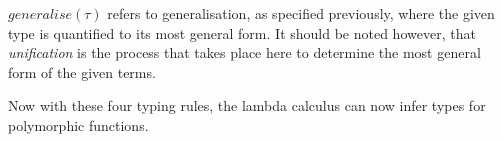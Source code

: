 \documentclass{l4proj}
\begin{document}
$generalise(\tau)$ refers to generalisation, as specified previously, where the given type is quantified to its most general form.
It should be noted however, that \emph{unification} is the process that takes place here to determine the most general form of the given terms.

Now with these four typing rules, the lambda calculus can now infer types for polymorphic functions.

    

    
    
    
    
\end{document}
